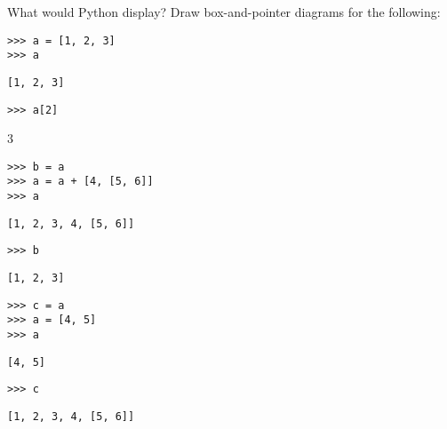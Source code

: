 \begin{blocksection}
\question What would Python display? Draw box-and-pointer diagrams for the following:

\begin{lstlisting}
>>> a = [1, 2, 3]
>>> a
\end{lstlisting}
\begin{solution}[.25in]
\begin{lstlisting}
[1, 2, 3]
\end{lstlisting}
\end{solution}

\begin{lstlisting}
>>> a[2]
\end{lstlisting}
\begin{solution}[.25in]
3
\end{solution}

\begin{lstlisting}
>>> b = a
>>> a = a + [4, [5, 6]]
>>> a
\end{lstlisting}
\begin{solution}[.25in]
\begin{lstlisting}
[1, 2, 3, 4, [5, 6]]
\end{lstlisting}
\end{solution}
\begin{lstlisting}
>>> b
\end{lstlisting}
\begin{solution}[.25in]
\begin{lstlisting}
[1, 2, 3]
\end{lstlisting}
\end{solution}

\begin{lstlisting}
>>> c = a
>>> a = [4, 5]
>>> a
\end{lstlisting}
\begin{solution}[.25in]
\begin{lstlisting}
[4, 5]
\end{lstlisting}
\end{solution}

\begin{lstlisting}
>>> c
\end{lstlisting}
\begin{solution}[.25in]
\begin{lstlisting}
[1, 2, 3, 4, [5, 6]]
\end{lstlisting}
\end{solution}
\end{blocksection}

